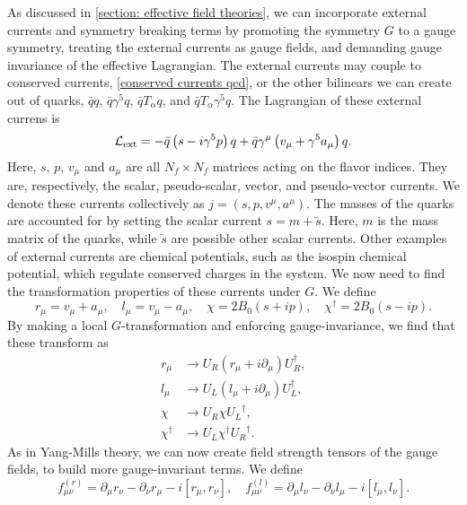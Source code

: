 As discussed in \autoref{section: effective field theories}, we can incorporate external currents and symmetry breaking terms by promoting the symmetry $G$ to a gauge symmetry, treating the external currents as gauge fields, and demanding gauge invariance of the effective Lagrangian.
The external currents may couple to conserved currents, \autoref{conserved currents qcd}, or the other bilinears we can create out of quarks, $\bar q q$, $\bar q\gamma^5 q$, $\bar q T_\alpha q$, and $\bar q T_\alpha \gamma^5 q$.
The Lagrangian of these external currens is
%
\begin{align}
    \mathcal{L}_{\text{ext}}
    = - \bar q \left(s - i \gamma^5 p \right) q
    + \bar q \gamma^\mu  \left(v_\mu + \gamma^5 a_\mu\right)q.
\end{align}
%
Here, $s$, $p$, $v_\mu$ and $a_\mu$ are all $N_f\times N_f$ matrices acting on the flavor indices.
They are, respectively, the scalar, pseudo-scalar, vector, and pseudo-vector currents.
We denote these currents collectively as $j = (s, p, v^\mu, a^\mu)$.
The masses of the quarks are accounted for by setting the scalar current $s = m + \tilde s$.
Here, $m$ is the mass matrix of the quarks, while $\tilde s$ are possible other scalar currents.
Other examples of external currents are chemical potentials, such as the isospin chemical potential, which regulate conserved charges in the system.
We now need to find the transformation properties of these currents under $G$.
We define
%
\begin{equation}
    r_\mu = v_\mu + a_\mu, \quad l_\mu = v_\mu - a_\mu, \quad  
    \chi = 2 B_0 (s +ip), \quad
    \chi^\dagger = 2 B_0(s - ip).
\end{equation}
%
By making a local $G$-transformation and enforcing gauge-invariance, we find that these transform as
%
\begin{align}
    r_\mu &\rightarrow U_R (r_\mu + i\partial_\mu) U_R^\dagger, \\
    l_\mu &\rightarrow U_L (l_\mu + i\partial_\mu) U_L^\dagger, \\
    \chi &\rightarrow U_R \chi {U_L}^\dagger, \\
    \chi^\dagger &\rightarrow U_L \chi^\dagger {U_R}^\dagger.
\end{align}
%
As in Yang-Mills theory, we can now create field strength tensors of the gauge fields, to build more gauge-invariant terms.
We define
%
\begin{equation}
    f_{\mu \nu}^{(r)} 
    = 
    \partial_\mu r_\nu - \partial_\nu r_\mu - i[r_\mu, r_\nu], 
    \quad f_{\mu \nu}^{(l)} 
    = \partial_\mu l_\nu - \partial_\nu l_\mu - i[l_\mu, l_\nu].
\end{equation}
